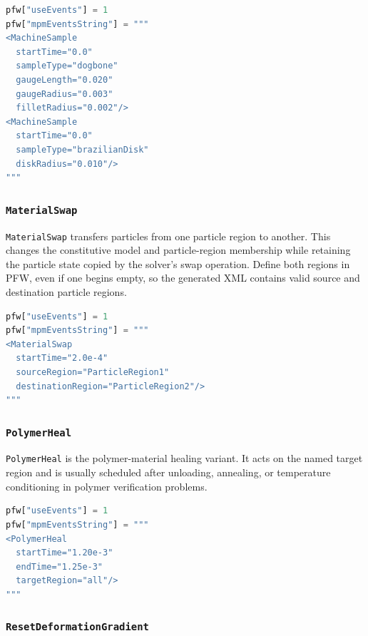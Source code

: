 \begin{lstlisting}[language=Python,caption={Sample-machining events.}]
pfw["useEvents"] = 1
pfw["mpmEventsString"] = """
<MachineSample
  startTime="0.0"
  sampleType="dogbone"
  gaugeLength="0.020"
  gaugeRadius="0.003"
  filletRadius="0.002"/>
<MachineSample
  startTime="0.0"
  sampleType="brazilianDisk"
  diskRadius="0.010"/>
"""
\end{lstlisting}

\subsubsection{\texttt{MaterialSwap}}

\texttt{MaterialSwap} transfers particles from one particle region to another.  This changes the constitutive model and particle-region membership while retaining the particle state copied by the solver's swap operation.  Define both regions in PFW, even if one begins empty, so the generated XML contains valid source and destination particle regions.

\begin{lstlisting}[language=Python,caption={Material-region swap event.}]
pfw["useEvents"] = 1
pfw["mpmEventsString"] = """
<MaterialSwap
  startTime="2.0e-4"
  sourceRegion="ParticleRegion1"
  destinationRegion="ParticleRegion2"/>
"""
\end{lstlisting}

\subsubsection{\texttt{PolymerHeal}}

\texttt{PolymerHeal} is the polymer-material healing variant.  It acts on the named target region and is usually scheduled after unloading, annealing, or temperature conditioning in polymer verification problems.

\begin{lstlisting}[language=Python,caption={Polymer-healing event.}]
pfw["useEvents"] = 1
pfw["mpmEventsString"] = """
<PolymerHeal
  startTime="1.20e-3"
  endTime="1.25e-3"
  targetRegion="all"/>
"""
\end{lstlisting}

\subsubsection{\texttt{ResetDeformationGradient}}

